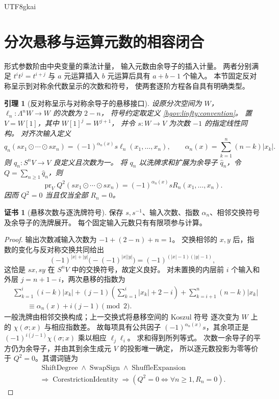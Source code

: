 \documentclass[12pt,a4paper,openany,notitlepage]{report}
\theoremstyle{plain}
\newtheorem{lemma}[theorem]{引理}
\theoremstyle{definition}
\newtheorem*{certificate}{证书}
\theoremstyle{remark}
\def\mathcal#1{#1}\def\mathsf#1{#1}\def\mathbb#1{#1}%
\begin{document}
\begin{CJK*}{UTF8}{gkai}
\section{分次悬移与运算元数的相容闭合}
\label{exp:hom:arity-grading}

形式参数阶由中央变量的乘法计量，
输入元数由余导子的插入计量。
两者分别满足 $t^it^j=t^{i+j}$ 与
$a$ 元运算插入 $b$ 元运算后具有 $a+b-1$ 个输入。
本节固定反对称呈示到对称余代数呈示的次数和符号，
使两套逐阶方程各自具有明确类型。

\begin{lemma}[反对称呈示与对称余导子的悬移接口]
\label{hgov:lem-suspension}
设原分次空间为 $W$，$\ell_n:\Lambda^nW\to W$ 的次数为 $2-n$，
符号约定取定义 \ref{hgov:linfty:convention}。
置 $V=W[1]$，其中 $W[1]^j=W^{j+1}$，
并令 $s:W\to V$ 为次数 $-1$ 的指定线性同构。
对齐次输入定义
\[
 q_n(sx_1\odot\cdots\odot sx_n)
 =(-1)^{\alpha_n(x)}s\ell_n(x_1,\ldots,x_n),
 \qquad
 \alpha_n(x)=\sum_{k=1}^{n}(n-k)|x_k|.
\]
则 $q_n:S^nV\to V$ 良定义且次数为一。
将 $q_n$ 以洗牌求和扩展为余导子 $\widehat q_n$，令
$Q=\sum_{n\ge1}\widehat q_n$，则
\[
 \operatorname{pr}_V Q^2(sx_1\odot\cdots\odot sx_n)
 =(-1)^{\alpha_n(x)}s\mathcal R_n(x_1,\ldots,x_n).
\]
因而 $Q^2=0$ 当且仅当全部 $\mathcal R_n=0$。
\end{lemma}
\begin{certificate}[悬移次数与逐洗牌符号]
保存 $s,s^{-1}$、输入次数、指数 $\alpha_n$、相邻交换符号及余导子的洗牌展开。
每个固定输入元数只有有限项参与计算。
\end{certificate}
\begin{proof}
输出次数减输入次数为
$-1+(2-n)+n=1$。
交换相邻的 $x,y$ 后，指数的变化与反对称交换共同给出
\[
 (-1)^{|x|+|y|}\bigl(-(-1)^{|x||y|}\bigr)
 =(-1)^{(|x|-1)(|y|-1)},
\]
这恰是 $sx,sy$ 在 $S^nV$ 中的交换符号，故定义良好。
对未置换的内层前 $i$ 个输入和外层 $j=n+1-i$，两次悬移的指数为
\[
 \begin{aligned}
 &\sum_{k=1}^{i}(i-k)|x_k|
 +(j-1)\left(\sum_{k=1}^{i}|x_k|+2-i\right)
 +\sum_{k=i+1}^{n}(n-k)|x_k|\\
 &\hspace{2em}\equiv\alpha_n(x)+i(j-1)\pmod2.
 \end{aligned}
\]
一般洗牌由相邻交换构成；上一交换式将悬移空间的 Koszul 符号
逐次变为 $W$ 上的 $\chi(\sigma;x)$ 与相应指数差。
故每项具有公共因子 $(-1)^{\alpha_n(x)}s$，其余项正是
$(-1)^{i(j-1)}\chi(\sigma;x)$ 乘以相应 $\ell_j\ell_i$。
求和得到所列等式。
次数一余导子的平方仍为余导子，并由其到余生成元 $V$ 的投影唯一确定，
所以逐元数投影为零等价于 $Q^2=0$。其谓词链为
\[
 \begin{gathered}
 \operatorname{ShiftDegree}\land\operatorname{SwapSign}\land
 \operatorname{ShuffleExpansion}\\
 \Rightarrow\operatorname{CorestrictionIdentity}
 \Rightarrow(Q^2=0\Longleftrightarrow\forall n\ge1,\mathcal R_n=0).
 \end{gathered}
\]
\end{proof}


\end{CJK*}
\end{document}
